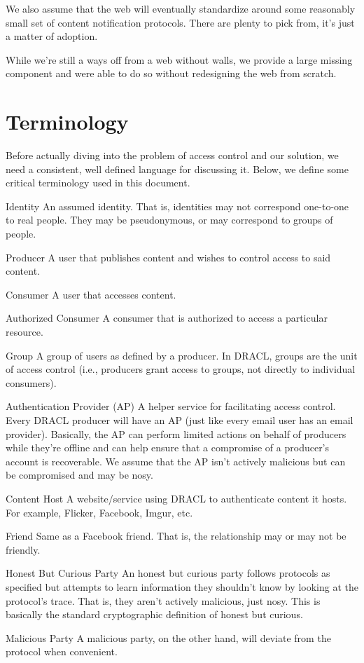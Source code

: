\documentclass[pdftex,12pt,a4papaer,twoside,notitlepage]{report}
\begin{document}
We also assume that the web will eventually standardize around some reasonably
small set of content notification protocols. There are plenty to pick from, it's
just a matter of adoption.

While we're still a ways off from a web without walls, we provide a large
missing component and were able to do so without redesigning the web from
scratch.

\section{Terminology}

Before actually diving into the problem of access control and our solution, we
need a consistent, well defined language for discussing it. Below, we define
some critical terminology used in this document.

\begin{compactdesc}
    \item[Identity] An assumed identity. That is, identities may not correspond
      one-to-one to real people. They may be pseudonymous, or may correspond to
      groups of people.
    \item[Producer] A user that publishes content and wishes to control
      access to said content.
    \item[Consumer] A user that accesses content.
    \item[Authorized Consumer] A consumer that is authorized to access a
      particular resource.
    \item[Group] A group of users as defined by a producer. In DRACL, groups
      are the unit of access control (i.e., producers grant access to groups,
      not directly to individual consumers).
    \item[Authentication Provider (AP)] A helper service for facilitating access
      control. Every DRACL producer will have an AP (just like every email user
      has an email provider). Basically, the AP can perform limited actions on
      behalf of producers while they're offline and can help ensure that a
      compromise of a producer's account is recoverable. We assume that the AP
      isn't actively malicious but can be compromised and may be nosy.
    \item[Content Host] A website/service using DRACL to authenticate content it
      hosts. For example, Flicker, Facebook, Imgur, etc.
    \item[Friend] Same as a Facebook friend. That is, the relationship may or
      may not be friendly.
    \item[Honest But Curious Party] An honest but curious party follows
      protocols as specified but attempts to learn information they shouldn't
      know by looking at the protocol's trace. That is, they aren't actively
      malicious, just nosy. This is basically the standard cryptographic
      definition of honest but curious.
    \item[Malicious Party] A malicious party, on the other hand, will deviate
      from the protocol when convenient.
\end{compactdesc}
\end{document}
